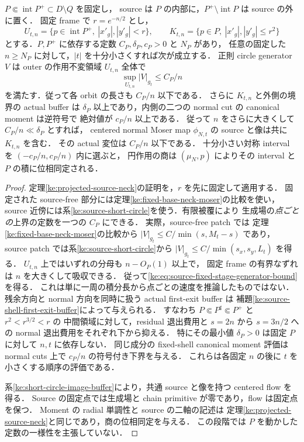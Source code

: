 \begin{lemma}
\label{ke:fixed-stage-source-neck}
$P\Subset\operatorname{int}P^+\subset D\setminus Q$ を固定し，
source は $P$ の内部に，$P^+\setminus\operatorname{int}P$ は source の外に置く．
固定 frame で $r=e^{-n/2}$ とし，
\[
 U_{t,n}=\{p\in\operatorname{int}P^+,\ |x'_g|,|y'_g|<r\},
 \qquad
 K_{t,n}=\{p\in P,\ |x'_g|,|y'_g|\le r^2\}
\]
とする．$P,P^+$ に依存する定数 $C_P,\delta_P,c_P>0$ と $N_P$ があり，
任意の固定した $n\ge N_P$ に対して，$|t|$ を十分小さくすれば次が成立する．
正則 circle generator $V$ は outer の作用不変領域 $U_{t,n}$ 全体で
\begin{equation}\label{ke:eq:source-fixed-stage-generator-bound}
 \sup_{U_{t,n}}|V|_{g_t}\le C_P/n
\end{equation}
を満たす．従って各 orbit の長さも $C_P/n$ 以下である．
さらに $K_{t,n}$ と外側の境界の actual buffer は
$\delta_P$ 以上であり，内側の二つの normal cut の canonical moment は逆符号で
絶対値が $c_P/n$ 以上である．
従って $n$ をさらに大きくして $C_P/n\ll\delta_P$ とすれば，
centered normal Moser map $\phi_{N,t}$ の source と像は共に $K_{t,n}$ を含む．
その actual 変位は $C_P/n$ 以下である．
十分小さい対称 interval を $(-c_P/n,c_P/n)$ 内に選ぶと，
円作用の商は $(\mu_N,p)$ によりその interval と $P$ の積に位相同定される．
\end{lemma}

\begin{proof}
定理\ref{ke:projected-source-neck}の証明を，$r$ を先に固定して適用する．
固定された source-free 部分には定理\ref{ke:fixed-base-neck-moser}の比較を使い，
source 近傍には系\ref{ke:source-short-circle}を使う．有限被覆により
生成場の\emph{点ごとの}上界の定数を一つの $C_P$ にできる．
実際，source-free patch では
定理\ref{ke:fixed-base-neck-moser}の比較から
$|V|_{g_t}\le C/\min(s,M_t-s)$ であり，
source patch では系\ref{ke:source-short-circle}から
$|V|_{g_t}\le C/\min(s_x,s_y,L_t)$ を得る．
$U_{t,n}$ 上ではいずれの分母も $n-O_P(1)$ 以上で，
固定 frame の有界なずれは $n$ を大きくして吸収できる．
従って\eqref{ke:eq:source-fixed-stage-generator-bound}を得る．
これは単に一周の積分長から点ごとの速度を推論したものではない．
残余方向と normal 方向を同時に扱う actual first-exit buffer は
補題\ref{ke:source-shell-first-exit-buffer}によって与えられる．
すなわち $P\Subset P^\sharp\Subset P^+$ と $r^2<r^{3/2}<r$ の
中間領域に対して，residual 退出費用と $s=2n$ から $s=3n/2$ への
normal 退出費用をそれぞれ下から抑える．
特にその最小値 $\delta_P>0$ は固定 $P$ に対して $n,t$ に依存しない．
同じ成分の fixed-shell canonical moment 評価は normal cuts 上で
$c_P/n$ の符号付き下界を与える．
これらは各固定 $n$ の後に $t$ を小さくする順序の評価である．

系\ref{ke:short-circle-image-buffer}により，共通 source と像を持つ centered flow を得る．
Source の固定点では生成場と chain primitive が零であり，flow は固定点を保つ．
Moment の radial 単調性と source の二軸の記述は
定理\ref{ke:projected-source-neck}と同じであり，商の位相同定を与える．
この段階では $P$ を動かした定数の一様性を主張していない．
\end{proof}

